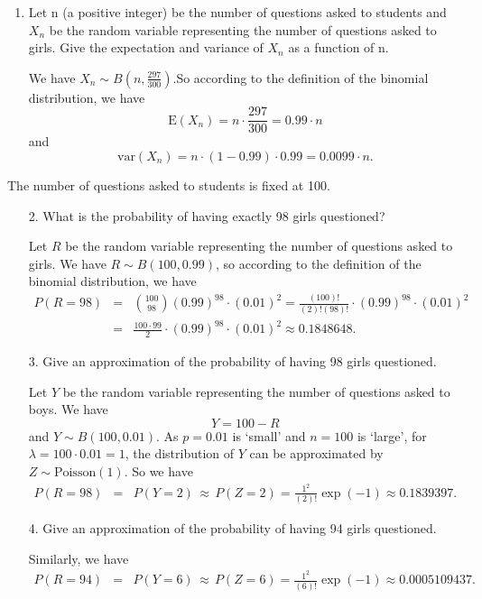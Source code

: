 \documentclass[12pt,thmsa]{article}
\begin{document}
\begin{enumerate}
\item Let n (a positive integer) be the number of questions asked to students and $X_n$ be the random variable representing the number of questions asked to girls. Give the expectation and variance of $X_n$ as a function of n.

We have $X_n \sim B(n,\frac{297}{300})$.So according to the definition
of the binomial distribution, we have
$$
\text{E}(X_n) = n\cdot \frac{297}{300}= 0.99 \cdot n
$$
and
$$
\text{var}(X_n) = n \cdot (1-0.99)\cdot 0.99 = 0.0099 \cdot n.
$$
\end{enumerate}
\medskip

The number of questions asked to students is fixed at 100.

\begin{enumerate}
\item[2.] What is the probability of having exactly 98 girls questioned?

Let $R$ be the random variable representing the number of questions asked to girls. We have $ R \sim B (100,0.99) $, so according to the definition of the binomial distribution,
we have
\begin{eqnarray*}
P(R= 98)&=& \binom{100}{98} (0.99)^{98} \cdot (0.01)^{2} = \frac{(100)!}{(2)!(98)!} \cdot (0.99)^{98} \cdot (0.01)^{2} \\
&=& \frac{100\cdot 99}{2} \cdot (0.99)^{98} \cdot (0.01)^{2} \approx  0.1848648.
\end{eqnarray*}
\item[3.] Give an approximation of the probability of having 98 girls questioned.

Let $Y$ be the random variable representing the number of questions asked to boys. We have
$$ Y = 100-R $$ and $ Y \sim B (100,0.01) $. As $ p = 0.01 $ is `small' and $ n = 100 $  is `large', for $ \lambda = 100 \cdot 0.01 = 1 $, the distribution of $ Y $ can be approximated by $Z \sim \text {Poisson} (1) $. So we have
\begin{eqnarray*}
P(R= 98) &=& P(Y= 2) \,\approx\, P(Z=2) = \frac{1^{2}}{(2)!}\exp(-1) \approx  0.1839397.
\end{eqnarray*}
\item[4.] Give an approximation of the probability of having 94 girls questioned.

Similarly, we have
\begin{eqnarray*}
P(R= 94) &=& P(Y= 6) \,\approx\, P(Z=6) = \frac{1^{2}}{(6)!}\exp(-1) \approx   0.0005109437.
\end{eqnarray*}

\end{enumerate}
\end{document}
